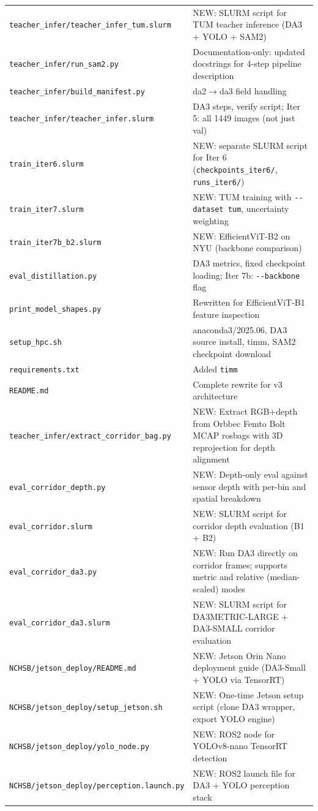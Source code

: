 \documentclass[11pt,a4paper]{article}
\begin{document}
\begin{longtable}{lp{8cm}}
\texttt{teacher\_infer/teacher\_infer\_tum.slurm} & NEW: SLURM script for TUM teacher inference (DA3 + YOLO + SAM2) \\
\texttt{teacher\_infer/run\_sam2.py} & Documentation-only: updated docstrings for 4-step pipeline description \\
\texttt{teacher\_infer/build\_manifest.py} & da2$\to$da3 field handling \\
\texttt{teacher\_infer/teacher\_infer.slurm} & DA3 steps, verify script; Iter 5: all 1449 images (not just val) \\
\texttt{train\_iter6.slurm}     & NEW: separate SLURM script for Iter 6 (\texttt{checkpoints\_iter6/}, \texttt{runs\_iter6/}) \\
\texttt{train\_iter7.slurm}     & NEW: TUM training with \texttt{-{}-dataset tum}, uncertainty weighting \\
\texttt{train\_iter7b\_b2.slurm} & NEW: EfficientViT-B2 on NYU (backbone comparison) \\
\texttt{eval\_distillation.py}  & DA3 metrics, fixed checkpoint loading; Iter 7b: \texttt{-{}-backbone} flag \\
\texttt{print\_model\_shapes.py} & Rewritten for EfficientViT-B1 feature inspection \\
\texttt{setup\_hpc.sh}         & anaconda3/2025.06, DA3 source install, timm, SAM2 checkpoint download \\
\texttt{requirements.txt}      & Added \texttt{timm} \\
\texttt{README.md}             & Complete rewrite for v3 architecture \\
\texttt{teacher\_infer/extract\_corridor\_bag.py} & NEW: Extract RGB+depth from Orbbec Femto Bolt MCAP rosbags with 3D reprojection for depth alignment \\
\texttt{eval\_corridor\_depth.py} & NEW: Depth-only eval against sensor depth with per-bin and spatial breakdown \\
\texttt{eval\_corridor.slurm}  & NEW: SLURM script for corridor depth evaluation (B1 + B2) \\
\texttt{eval\_corridor\_da3.py} & NEW: Run DA3 directly on corridor frames; supports metric and relative (median-scaled) modes \\
\texttt{eval\_corridor\_da3.slurm} & NEW: SLURM script for DA3METRIC-LARGE + DA3-SMALL corridor evaluation \\
\texttt{NCHSB/jetson\_deploy/README.md}       & NEW: Jetson Orin Nano deployment guide (DA3-Small + YOLO via TensorRT) \\
\texttt{NCHSB/jetson\_deploy/setup\_jetson.sh} & NEW: One-time Jetson setup script (clone DA3 wrapper, export YOLO engine) \\
\texttt{NCHSB/jetson\_deploy/yolo\_node.py}    & NEW: ROS2 node for YOLOv8-nano TensorRT detection \\
\texttt{NCHSB/jetson\_deploy/perception.launch.py} & NEW: ROS2 launch file for DA3 + YOLO perception stack \\
\bottomrule
\end{longtable}
\end{document}
